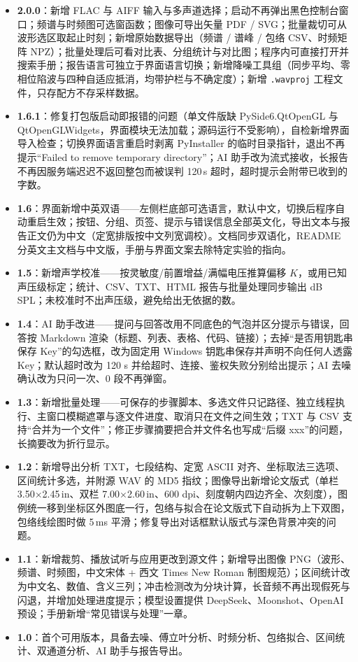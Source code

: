 \documentclass[UTF8,a4paper,12pt,scheme=chinese]{ctexart}
\begin{document}
\begin{itemize}
  \item \textbf{2.0.0}：新增 FLAC 与 AIFF 输入与多声道选择；启动不再弹出黑色控制台窗口；频谱与时频图可选窗函数；图像可导出矢量 PDF / SVG；批量裁切可从波形选区取起止时刻；新增原始数据导出（频谱 / 谱峰 / 包络 CSV、时频矩阵 NPZ）；批量处理后可看对比表、分组统计与对比图；程序内可直接打开并搜索手册；报告语言可独立于界面语言切换；新增降噪工具组（同步平均、零相位陷波与四种自适应抵消，均带护栏与不确定度）；新增 \texttt{.wavproj} 工程文件，只存配方不存采样数据。
\item \textbf{1.6.1}：修复打包版启动即报错的问题（单文件版缺 PySide6.QtOpenGL 与 QtOpenGLWidgets，界面模块无法加载；源码运行不受影响），自检新增界面导入检查；切换界面语言重启时剥离 PyInstaller 的临时目录指针，退出不再提示“Failed to remove temporary directory”；AI 助手改为流式接收，长报告不再因服务端迟迟不返回整包而被误判 120\,s 超时，超时提示会附带已收到的字数。
  \item \textbf{1.6}：界面新增中英双语——左侧栏底部可选语言，默认中文，切换后程序自动重启生效；按钮、分组、页签、提示与错误信息全部英文化，导出文本与报告正文仍为中文（定宽排版按中文列宽调校）。文档同步双语化，README 分英文主文档与中文版，手册与界面文案去除特定实验的指向。
  \item \textbf{1.5}：新增声学校准——按灵敏度/前置增益/满幅电压推算偏移 $K$，或用已知声压级标定；统计、CSV、TXT、HTML 报告与批量处理同步输出 dB SPL；未校准时不出声压级，避免给出无依据的数。
  \item \textbf{1.4}：AI 助手改进——提问与回答改用不同底色的气泡并区分提示与错误，回答按 Markdown 渲染（标题、列表、表格、代码、链接）；去掉“是否用钥匙串保存 Key”的勾选框，改为固定用 Windows 钥匙串保存并声明不向任何人透露 Key；默认超时改为 120 s 并给超时、连接、鉴权失败分别给出提示；AI 去噪确认改为只问一次、0 段不再弹窗。
  \item \textbf{1.3}：新增批量处理——可保存的步骤脚本、多选文件只记路径、独立线程执行、主窗口模糊遮罩与逐文件进度、取消只在文件之间生效；TXT 与 CSV 支持“合并为一个文件”；修正步骤摘要把合并文件名也写成“后缀 xxx”的问题，长摘要改为折行显示。
  \item \textbf{1.2}：新增导出分析 TXT，七段结构、定宽 ASCII 对齐、坐标取法三选项、区间统计多选，并附源 WAV 的 MD5 指纹；图像导出新增论文版式（单栏 3.50$\times$2.45\,in、双栏 7.00$\times$2.60\,in、600 dpi、刻度朝内四边齐全、次刻度），图例统一移到坐标区外图底一行，包络与拟合在论文版式下自动拆为上下双图，包络线绘图时做 5\,ms 平滑；修复导出对话框默认版式与深色背景冲突的问题。
  \item \textbf{1.1}：新增裁剪、播放试听与应用更改到源文件；新增导出图像 PNG（波形、频谱、时频图，中文宋体 + 西文 Times New Roman 制图规范）；区间统计改为中文名、数值、含义三列；冲击检测改为分块计算，长音频不再出现假死与闪退，并增加处理进度提示；模型设置提供 DeepSeek、Moonshot、OpenAI 预设；手册新增“常见错误与处理”一章。
  \item \textbf{1.0}：首个可用版本，具备去噪、傅立叶分析、时频分析、包络拟合、区间统计、双通道分析、AI 助手与报告导出。
\end{itemize}
\end{document}
